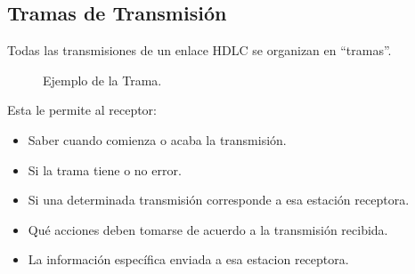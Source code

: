 \subsection*{Tramas de Transmisión}
Todas las transmisiones de un enlace HDLC se organizan en ``tramas''.\\

\begin{figure}[ht!]
\centering
{}
\caption{Ejemplo de la Trama.}
\end{figure}

Esta le permite al receptor:
\begin{itemize}
\item Saber cuando comienza o acaba la transmisión.
\item Si la trama tiene o no error.
\item Si una determinada transmisión corresponde a esa estación receptora.
\item Qué acciones deben tomarse de acuerdo a la transmisión recibida.
\item La información específica enviada a esa estacion receptora.
\end{itemize}

